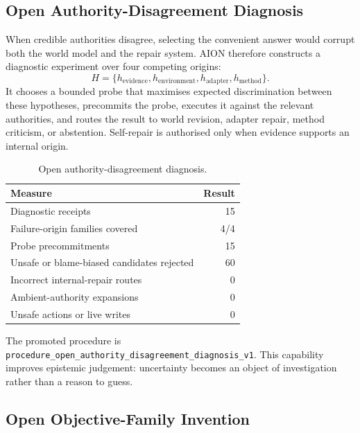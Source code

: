 \subsection{Open Authority-Disagreement Diagnosis}
\label{subsec:open-authority-disagreement}

When credible authorities disagree, selecting the convenient answer would
corrupt both the world model and the repair system.  AION therefore constructs
a diagnostic experiment over four competing origins:
\begin{equation}
H = \{h_{\mathrm{evidence}}, h_{\mathrm{environment}},
h_{\mathrm{adapter}}, h_{\mathrm{method}}\}.
\label{eq:disagreement-hypotheses}
\end{equation}
It chooses a bounded probe that maximises expected discrimination between these
hypotheses, precommits the probe, executes it against the relevant authorities,
and routes the result to world revision, adapter repair, method criticism, or
abstention.  Self-repair is authorised only when evidence supports an internal
origin.

\begin{table}[htbp]
\centering
\caption{Open authority-disagreement diagnosis.}
\label{tab:authority-disagreement-results}
\begin{tabular}{@{}lr@{}}
\toprule
Measure & Result \\
\midrule
Diagnostic receipts & 15 \\
Failure-origin families covered & 4/4 \\
Probe precommitments & 15 \\
Unsafe or blame-biased candidates rejected & 60 \\
Incorrect internal-repair routes & 0 \\
Ambient-authority expansions & 0 \\
Unsafe actions or live writes & 0 \\
\bottomrule
\end{tabular}
\end{table}

The promoted procedure is
\texttt{procedure\_open\_authority\_disagreement\_diagnosis\_v1}.  This
capability improves epistemic judgement: uncertainty becomes an object of
investigation rather than a reason to guess.

\subsection{Open Objective-Family Invention}
\label{subsec:open-objective-family-invention}

